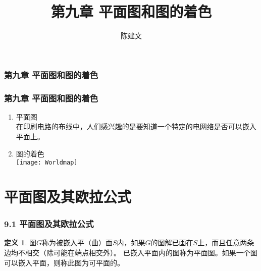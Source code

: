 \documentclass{beamer}
\begin{document}
\begin{CJK}{UTF8}{gbsn}
\newtheorem{Exercise}{习题}
\newtheorem{Thm}{定理}[section]
\newtheorem*{Thm1}{定理1.1}
\newtheorem*{Thm2}{定理4.1}
\newtheorem*{Thm3}{定理4.5}
\newtheorem{Cor}{推论}
\theoremstyle{definition}
\newtheorem{Def}{定义}[section]
\theoremstyle{example}
\newtheorem*{Ex}{例：}
\date{}
\author{陈建文}

\title{第九章 平面图和图的着色}
\begin{frame}
  \titlepage
  
\end{frame}
\begin{frame}
  \frametitle{第九章 平面图和图的着色}
\end{frame}

\begin{frame}
  \frametitle{第九章 平面图和图的着色}
  \begin{enumerate}
  \item 平面图\\
\pause
在印刷电路的布线中，人们感兴趣的是要知道一个特定的电网络是否可以嵌入平面上。
\pause
\item 图的着色\\
\pause
\texttt{[image: Worldmap]}
  \end{enumerate}
\end{frame}

\section{平面图及其欧拉公式}
\begin{frame}
  \frametitle{9.1 平面图及其欧拉公式}
\pause
  \begin{Def}
    图$G$称为被嵌入平（曲）面$S$内，如果$G$的图解已画在$S$上，而且任意两条边均不相交（除可能在端点相交外）。
已嵌入平面内的图称为\alert{平面图}。如果一个图可以嵌入平面，则称此图为\alert{可平面}的。
\end{Def}
\end{frame}


\end{CJK}
\end{document}
